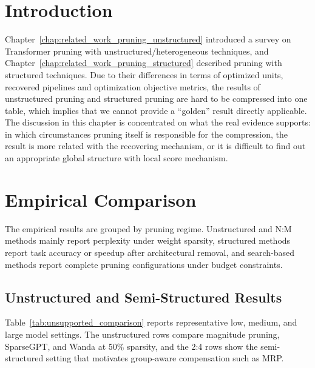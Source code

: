 \section{Introduction}
Chapter~\ref{chap:related_work_pruning_unstructured} introduced a survey on Transformer pruning with unstructured/heterogeneous techniques, and Chapter~\ref{chap:related_work_pruning_structured} described pruning with structured techniques. Due to their differences in terms of optimized units, recovered pipelines and optimization objective metrics, the results of unstructured pruning and structured pruning are hard to be compressed into one table, which implies that we cannot provide a ``golden'' result directly applicable. The discussion in this chapter is concentrated on what the real evidence supports: in which circumstances pruning itself is responsible for the compression, the result is more related with the recovering mechanism, or it is difficult to find out an appropriate global structure with local score mechanism.


\section{Empirical Comparison}
\label{subsec:empirical_comparison}

The empirical results are grouped by pruning regime. Unstructured and N:M methods mainly report perplexity under weight sparsity, structured methods report task accuracy or speedup after architectural removal, and search-based methods report complete pruning configurations under budget constraints.

\subsection{Unstructured and Semi-Structured Results}

Table~\ref{tab:unsupported_comparison} reports representative low, medium, and large model settings. The unstructured rows compare magnitude pruning, SparseGPT, and Wanda at 50\% sparsity, and the 2:4 rows show the semi-structured setting that motivates group-aware compensation such as MRP.

